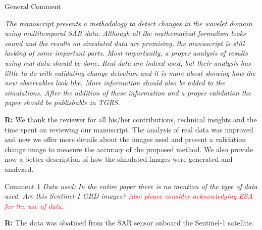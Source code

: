\documentclass[11pt]{report}
\begin{document}
\begin{mybox}{General Comment}

\textit{The manuscript presents a methodology to detect changes in the wavelet domain using multitemporal SAR
data. Although all the mathematical formalism looks sound and the results on simulated data are promising,
the manuscript is still lacking of some important parts. Most importantly, a proper analysis of results using
real data should be done. Real data are indeed used, but their analysis has little to do with validating change
detection and it is more about showing how the new observables look like. More information should also be
added to the simulations. After the addition of these information and a proper validation the paper should be
publishable in TGRS.}
\medskip

\textbf{R:} We thank the reviewer for all his/her contributions, technical insights and the time
spent on reviewing our manuscript. The analysis of real data was improved and now we offer more details about the images used and present a validation change image to measure the accuracy of the proposed method. We also provide now a better description of how the simulated images were generated and analyzed.
\end{mybox}

\medskip
\begin{mybox}{Comment 1}
\textit{Data used: In the entire paper there is no mention of the type of data used. Are this Sentinel-1 GRD images?
\textcolor{red}{Also please consider acknowledging ESA for the use of data.}}


\medskip
\textbf{R:} The data was obatined from the SAR sensor onboard the Sentinel-1 satellite.
\end{mybox}
\end{document}
